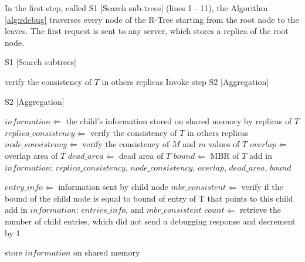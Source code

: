 In the first step, called S1 [Search sub-trees] (lines 1 - 11), the Algorithm \ref{alg:rdebug} traverses every node of the R-Tree starting from the root node to the leaves.
The first request is sent to any server, which stores a replica of the root node.

\medskip
\begin{center}
\begin{minipage}{1\textwidth}
\begin{algorithm2e}[H]
\SetAlFnt{\small\sf}
 \DontPrintSemicolon
 \LinesNumbered
\SetAlgoLined
 \BlankLine
 \BlankLine

 S1 [Search subtrees]

{
  verify the consistency of $T$ in others replicas\;
      Invoke step S2 [Aggregation]\;
}

S2 [Aggregation]

$information \Leftarrow$ the child's information stored on shared memory by replicas of $T$\;
$replica\_consistency \Leftarrow$ verify the consistency of $T$ in others replicas\;
$node\_consistency \Leftarrow$	verify the consistency of $M$ and $m$ values of  $T$\;
$overlap \Leftarrow$ overlap area of $T$\;
$dead\_area \Leftarrow$ dead area of $T$\;
$bound \Leftarrow$ MBR of $T$\;
add in $information$: $replica\_consistency$, $node\_consistency$, $overlap$, $dead\_area$, $bound$\;

{
$entry\_info \Leftarrow$ information sent by child node\;
$mbr\_consistent \Leftarrow$ verify if the bound of the child node is equal to bound of entry of T that points to this child\;
add in $information$: $entries\_info$, and $mbr\_consistent$\;
$count \Leftarrow$ retrieve the number of child entries, which did not send a debugging response and decrement by 1\;

{
store $information$ on shared memory\;
}
          
}
\caption{$RDebug(T)$ 
\label {alg:rdebug}}
\end{algorithm2e}
\end{minipage}
\end{center}

